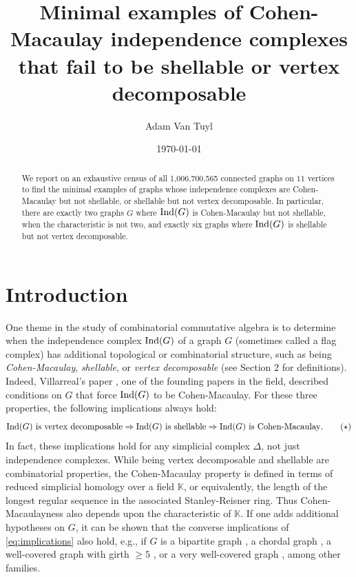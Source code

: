 \documentclass[12pt]{amsart}
\title[Minimal Examples]{Minimal examples of Cohen-Macaulay independence
complexes that fail to be shellable or vertex decomposable}
\author[A. Van Tuyl]{Adam Van Tuyl}
\theoremstyle{plain}
\theoremstyle{definition}
\theoremstyle{remark}
\numberwithin{equation}{section}
\numberwithin{equation}{section}
\begin{document}
\begin{abstract}
We report on an exhaustive census of all 
1,006,700,565 connected graphs 
on $11$ vertices to find the minimal examples of 
graphs 
whose independence complexes are Cohen-Macaulay
but not shellable, or shellable but not vertex decomposable. 
In particular, there are exactly two graphs $G$ where ${\rm Ind}(G)$ is 
Cohen-Macaulay but not shellable, when the characteristic is not two, and exactly six graphs where ${\rm Ind}(G)$ is shellable but not vertex decomposable.
\end{abstract}

\date{\today}

\maketitle

\section{Introduction}
One theme in the study of combinatorial commutative algebra
is to  determine when the independence complex ${\rm Ind}(G)$ 
of a graph $G$ (sometimes called a flag complex) has additional 
topological or combinatorial structure, such as being
{\it Cohen-Macaulay}, {\it shellable}, or 
{\it vertex decomposable} (see 
Section 2 for definitions).  Indeed, Villarreal's paper \cite{V1990},
one of the founding papers in the field,
described conditions on $G$ that force ${\rm Ind}(G)$ to 
be Cohen-Macaulay.
For these three properties,  the following implications always hold:
\begin{equation}\label{eq:implications}
{\rm Ind}(G)~\text{is vertex decomposable}
\Rightarrow {\rm Ind}(G)~\text{is shellable} 
\Rightarrow {\rm Ind}(G)~\text{is Cohen-Macaulay}.
\tag{$\star$}
\end{equation}
In fact, these implications hold for any simplicial complex $\Delta$,
not just independence complexes.  While being vertex 
decomposable and shellable
are combinatorial properties, the Cohen-Macaulay property is defined in terms
of reduced simplicial homology over a field $\mathbb{K}$, or equivalently,
the length of the longest regular sequence in the associated Stanley-Reisner ring. Thus Cohen-Macaulayness also
depends upon the characteristic of $\mathbb{K}$.
If one adds additional hypotheses
on $G$, it can be shown that the converse implications of \eqref{eq:implications} also hold, e.g.,
if $G$ is a bipartite graph \cite{VT2009}, a chordal
graph \cites{DE2009,HHZ2006,W2009}, a well-covered graph with girth
$\geq 5$ \cite{BC2014},  or a very well-covered graph \cite{Metal2011}, among
other families.  
\end{document}
